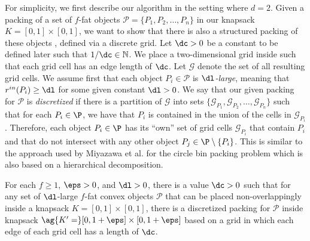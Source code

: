 For simplicity, we first describe our algorithm in the setting where $d=2$.
Given a packing of a set of $f$-fat objects $\mathcal{P}=\{P_1, P_2, \dots, P_n\}$ in our knapsack $K=[0, 1] \times [0, 1]$, we want to show that there is also a structured packing of these objects , defined via a discrete grid. Let $\dc>0$ be a constant to be defined later such that $1/\dc \in \mathbb{N}$. We place a two-dimensional grid inside  such that each grid cell has an edge length of $\dc$. Let $\mathcal{G}$ denote the set of all resulting grid cells. We assume first that each object $P_i \in \mathcal{P}$ is \emph{$\dl$-large}, meaning that $r^{in}(P_i) \ge \dl$ for some given constant $\dl>0$. We say that our given packing for $\mathcal{P}$ is {\em discretized} if there is a partition of $\mathcal{G}$ into sets $\{\mathcal{G}_{P_1}, \mathcal{G}_{P_2}, \dots, \mathcal{G}_{P_n}\}$ such that for each $P_i \in \P$, we have that $P_i$ is contained in the union of the cells in $\mathcal{G}_{P_i}$. Therefore, each object $P_i \in \P$ has its ``own'' set of grid cells $\mathcal{G}_{P_i}$ that contain $P_i$ and that do not intersect with any other object $P_j \in \P \setminus \{P_i\}$. 
{This is similar to the approach used by Miyazawa et al. \cite{MiyazawaPSSW16} for the circle bin packing problem which is also based on a hierarchical decomposition.}



\begin{lemma}%
	\label{lem:fatdisc}
	For each $f \ge 1$, $\eps>0$, and $\dl>0$, there is a value $\dc>0$ such that for any set of $\dl$-large $f$-fat convex objects $\mathcal{P}$
	that can be placed non-overlappingly inside a knapsack $K=[0, 1] \times [0, 1]$, there is a discretized packing
	for $\mathcal{P}$ inside knapsack $\ag{K'= } [0, 1+\eps] \times [0, 1+\eps]$
	based on a grid in which each edge of each grid cell has a length of $\dc$.
\end{lemma}

